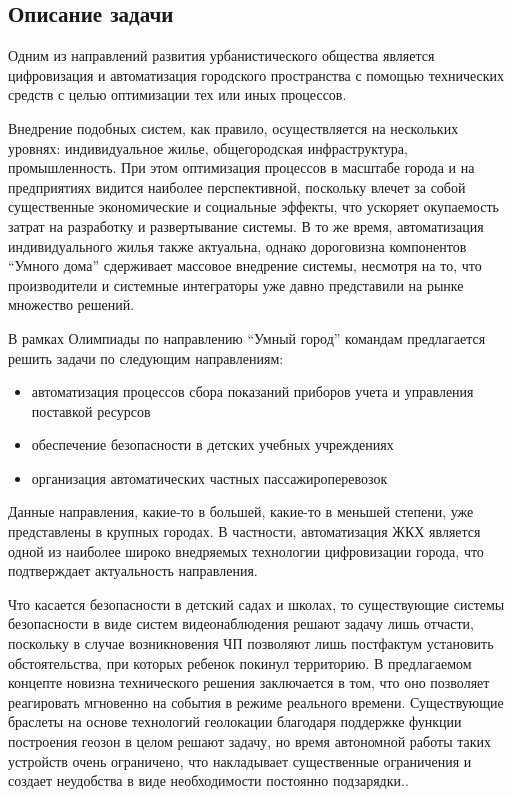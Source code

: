 \subsection*{Описание задачи}

Одним из направлений развития урбанистического общества является цифровизация и автоматизация городского пространства с помощью технических средств с целью оптимизации тех или иных процессов.

Внедрение подобных систем, как правило, осуществляется на нескольких уровнях: индивидуальное жилье, общегородская инфраструктура, промышленность. При этом оптимизация процессов в масштабе города и на предприятиях видится наиболее перспективной, поскольку влечет за собой существенные экономические и социальные эффекты, что ускоряет окупаемость затрат на разработку и развертывание системы. В то же время, автоматизация индивидуального жилья также актуальна, однако дороговизна компонентов “Умного дома” сдерживает массовое внедрение системы, несмотря на то, что производители и системные интеграторы уже давно представили на рынке множество решений.

В рамках Олимпиады по направлению “Умный город” командам предлагается решить задачи по следующим направлениям:

\begin{itemize}
    \item автоматизация процессов сбора показаний приборов учета и управления поставкой ресурсов
    \item обеспечение безопасности в детских учебных учреждениях
    \item организация автоматических частных пассажироперевозок    
\end{itemize}

Данные направления, какие-то в большей, какие-то в меньшей степени, уже представлены в крупных городах. В частности, автоматизация ЖКХ является одной из наиболее широко внедряемых технологии цифровизации города, что подтверждает актуальность направления.

Что касается безопасности в детский садах и школах, то существующие системы безопасности в виде систем видеонаблюдения решают задачу лишь отчасти, поскольку в случае возникновения ЧП позволяют лишь постфактум установить обстоятельства, при которых ребенок покинул территорию. В предлагаемом концепте новизна технического решения заключается в том, что оно позволяет реагировать мгновенно на события в режиме реального времени. Существующие браслеты на основе технологий геолокации благодаря поддержке функции построения геозон в целом решают задачу, но время автономной работы таких устройств очень ограничено, что накладывает существенные ограничения и создает неудобства в виде необходимости постоянно подзарядки..

